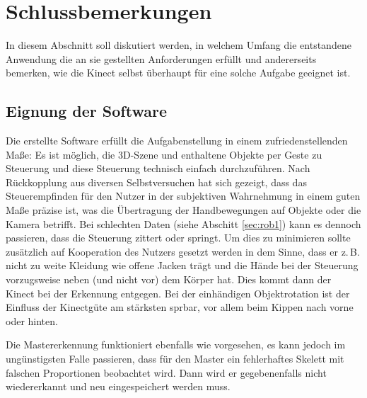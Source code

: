 \section{Schlussbemerkungen}\label{sec:schluss}
In diesem Abschnitt soll diskutiert werden, in welchem Umfang die entstandene Anwendung die an sie gestellten Anforderungen erfüllt und andererseits bemerken, wie die Kinect selbst überhaupt für eine solche Aufgabe geeignet ist.
%
%
\subsection{Eignung der Software}\label{sec:programm}
Die erstellte Software erfüllt die Aufgabenstellung in einem zufriedenstellenden Maße: Es ist möglich, die 3D-Szene und enthaltene Objekte per Geste zu Steuerung und diese Steuerung technisch einfach durchzuführen. Nach Rückkopplung aus diversen Selbstversuchen hat sich gezeigt, dass das Steuerempfinden für den Nutzer in der subjektiven Wahrnehmung in einem guten Maße präzise ist, was die Übertragung der Handbewegungen auf Objekte oder die Kamera betrifft. Bei schlechten Daten (siehe Abschitt \ref{sec:rob1}) kann es dennoch passieren, dass die Steuerung zittert oder springt. Um dies zu minimieren sollte zusätzlich auf Kooperation des Nutzers gesetzt werden in dem Sinne, dass er z.\,B. nicht zu weite Kleidung wie offene Jacken trägt und die Hände bei der Steuerung vorzugsweise neben (und nicht vor) dem Körper hat. Dies kommt dann der Kinect bei der Erkennung entgegen. Bei der einhändigen Objektrotation ist der Einfluss der Kinectgüte am stärksten sprbar, vor allem beim Kippen nach vorne oder hinten.\par
Die Mastererkennung funktioniert ebenfalls wie vorgesehen, es kann jedoch im ungünstigsten Falle passieren, dass für den Master ein fehlerhaftes Skelett mit falschen Proportionen beobachtet wird. Dann wird er gegebenenfalls nicht wiedererkannt und neu eingespeichert werden muss.
%
